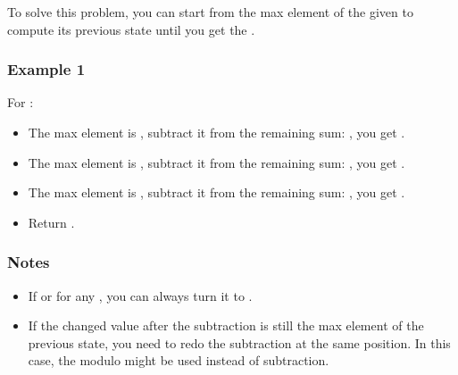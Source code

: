 \documentclass[letterpaper,12pt,english]{book}
\begin{document}
\sphinxAtStartPar
To solve this problem, you can start from the max element of the given  to compute its previous state until you get the .


\subsubsection{Example 1}
\label{\detokenize{Priority_Queue/1354_Construct_Target_Array_With_Multiple_Sums:id1}}
\sphinxAtStartPar
For :
\begin{itemize}
\item {} 
\sphinxAtStartPar
The max element is , subtract it from the remaining sum: , you get .

\item {} 
\sphinxAtStartPar
The max element is , subtract it from the remaining sum: , you get .

\item {} 
\sphinxAtStartPar
The max element is , subtract it from the remaining sum: , you get .

\item {} 
\sphinxAtStartPar
Return .

\end{itemize}


\subsubsection{Notes}
\label{\detokenize{Priority_Queue/1354_Construct_Target_Array_With_Multiple_Sums:notes}}\begin{itemize}
\item {} 
\sphinxAtStartPar
If  or  for any , you can always turn it to .

\item {} 
\sphinxAtStartPar
If the changed value after the subtraction is still the max element of the previous state, you need to redo the subtraction at the same position. In this case, the modulo might be used instead of subtraction.

\end{itemize}
\end{document}
